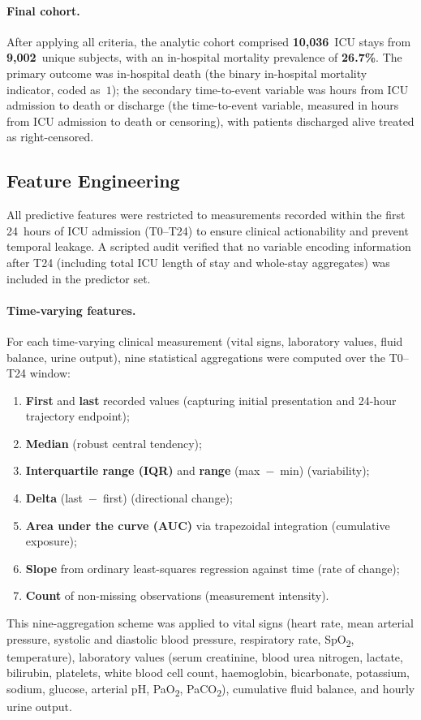 \documentclass[11pt]{article}
\begin{document}
\paragraph{Final cohort.}
After applying all criteria, the analytic cohort comprised \textbf{10,036}~ICU
stays from \textbf{9,002}~unique subjects, with an in-hospital mortality
prevalence of \textbf{26.7\%}.  The primary outcome was in-hospital death
(the binary in-hospital mortality indicator, coded as~$1$); the secondary time-to-event variable was hours
from ICU admission to death or discharge (the time-to-event variable, measured in hours from ICU admission to death or censoring), with
patients discharged alive treated as right-censored.


\subsection{Feature Engineering}\label{sec:features}

All predictive features were restricted to measurements recorded within the
first 24~hours of ICU admission (T0--T24) to ensure clinical actionability and
prevent temporal leakage.  A scripted audit verified that no variable encoding
information after T24 (including total ICU length of stay and whole-stay
aggregates) was included in the predictor set.

\paragraph{Time-varying features.}
For each time-varying clinical measurement (vital signs, laboratory values,
fluid balance, urine output), nine statistical aggregations were computed over
the T0--T24 window:
\begin{enumerate}
  \item \textbf{First} and \textbf{last} recorded values (capturing initial
        presentation and 24-hour trajectory endpoint);
  \item \textbf{Median} (robust central tendency);
  \item \textbf{Interquartile range (IQR)} and \textbf{range}
        (max~$-$~min) (variability);
  \item \textbf{Delta} (last~$-$~first) (directional change);
  \item \textbf{Area under the curve (AUC)} via trapezoidal integration
        (cumulative exposure);
  \item \textbf{Slope} from ordinary least-squares regression against time
        (rate of change);
  \item \textbf{Count} of non-missing observations (measurement intensity).
\end{enumerate}
This nine-aggregation scheme was applied to vital signs (heart rate, mean
arterial pressure, systolic and diastolic blood pressure, respiratory rate,
SpO\textsubscript{2}, temperature), laboratory values (serum creatinine, blood
urea nitrogen, lactate, bilirubin, platelets, white blood cell count,
haemoglobin, bicarbonate, potassium, sodium, glucose, arterial pH,
PaO\textsubscript{2}, PaCO\textsubscript{2}), cumulative fluid balance, and
hourly urine output.
\end{document}
